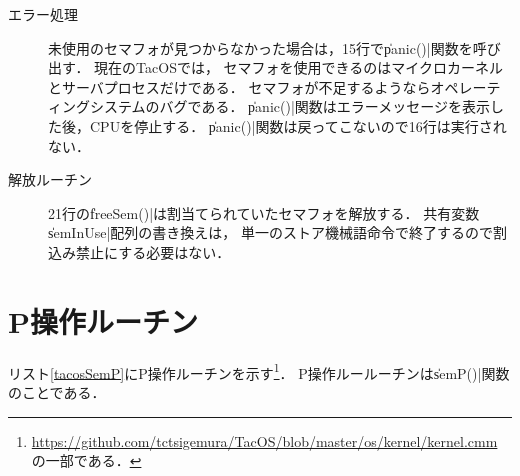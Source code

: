 \begin{description}
\item [エラー処理]
  未使用のセマフォが見つからなかった場合は，15行で\|panic()|関数を呼び出す．
  現在のTacOSでは，
  セマフォを使用できるのはマイクロカーネルとサーバプロセスだけである．
  セマフォが不足するようならオペレーティングシステムのバグである．
  \|panic()|関数はエラーメッセージを表示した後，CPUを停止する．
  \|panic()|関数は戻ってこないので16行は実行されない．

\item [解放ルーチン]
  21行の\|freeSem()|は割当てられていたセマフォを解放する．
  共有変数\|semInUse|配列の書き換えは，
  単一のストア機械語命令で終了するので割込み禁止にする必要はない．
\end{description}

\section{P操作ルーチン}
リスト\ref{tacosSemP}にP操作ルーチンを示す\footnote{
  \url{https://github.com/tctsigemura/TacOS/blob/master/os/kernel/kernel.cmm}
  の一部である．}．
P操作ルールーチンは\|semP()|関数のことである．



